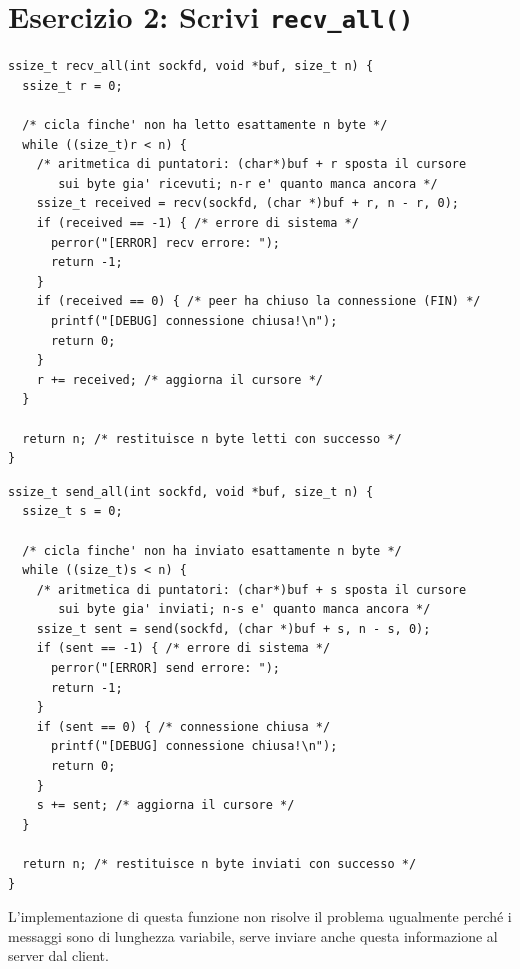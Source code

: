 \documentclass[a4paper,12pt]{article}
\begin{document}
\section{Esercizio 2: Scrivi \texttt{recv\_all()}}

\begin{lstlisting}[caption={recv\_all() -- implementazione}]
ssize_t recv_all(int sockfd, void *buf, size_t n) {
  ssize_t r = 0;

  /* cicla finche' non ha letto esattamente n byte */
  while ((size_t)r < n) {
    /* aritmetica di puntatori: (char*)buf + r sposta il cursore
       sui byte gia' ricevuti; n-r e' quanto manca ancora */
    ssize_t received = recv(sockfd, (char *)buf + r, n - r, 0);
    if (received == -1) { /* errore di sistema */
      perror("[ERROR] recv errore: ");
      return -1;
    }
    if (received == 0) { /* peer ha chiuso la connessione (FIN) */
      printf("[DEBUG] connessione chiusa!\n");
      return 0;
    }
    r += received; /* aggiorna il cursore */
  }

  return n; /* restituisce n byte letti con successo */
}
\end{lstlisting}

\begin{lstlisting}[caption={send\_all() -- implementazione}]
ssize_t send_all(int sockfd, void *buf, size_t n) {
  ssize_t s = 0;

  /* cicla finche' non ha inviato esattamente n byte */
  while ((size_t)s < n) {
    /* aritmetica di puntatori: (char*)buf + s sposta il cursore
       sui byte gia' inviati; n-s e' quanto manca ancora */
    ssize_t sent = send(sockfd, (char *)buf + s, n - s, 0);
    if (sent == -1) { /* errore di sistema */
      perror("[ERROR] send errore: ");
      return -1;
    }
    if (sent == 0) { /* connessione chiusa */
      printf("[DEBUG] connessione chiusa!\n");
      return 0;
    }
    s += sent; /* aggiorna il cursore */
  }

  return n; /* restituisce n byte inviati con successo */
}
\end{lstlisting}

L'implementazione di questa funzione non risolve il problema ugualmente perché i messaggi
sono di lunghezza variabile, serve inviare anche questa informazione al server dal client.

\end{document}
